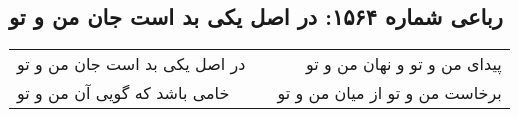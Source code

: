 \begin{center}
\section*{رباعی شماره ۱۵۶۴: در اصل یکی بد است جان من و تو}
\label{sec:1564}
\begin{longtable}{l p{0.5cm} r}
در اصل یکی بد است جان من و تو
&&
پیدای من و تو و نهان من و تو
\\
خامی باشد که گویی آن من و تو
&&
برخاست من و تو از میان من و تو
\\
\end{longtable}
\end{center}
